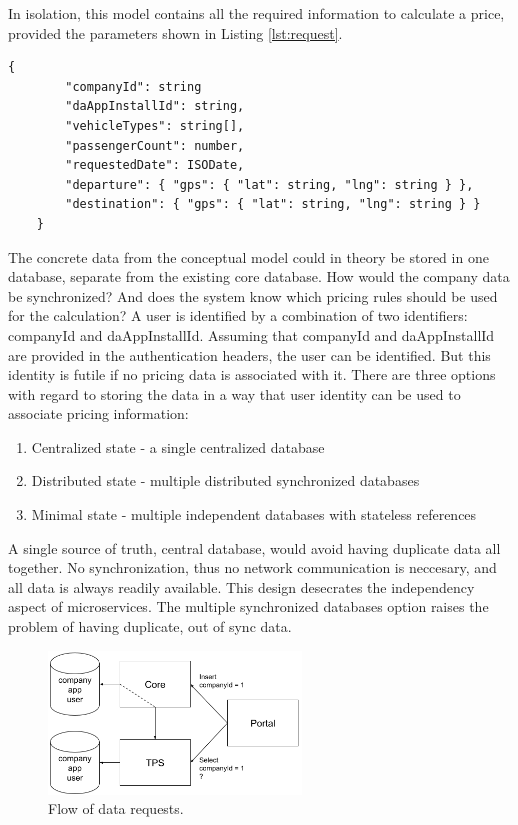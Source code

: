 In isolation, this model contains all the required information to calculate a price, provided the parameters shown in Listing \ref{lst:request}.

\begin{lstlisting}[caption={Minimal external information required for a trip price calculation.}, label={lst:request}]
	{
		"companyId": string
		"daAppInstallId": string,
		"vehicleTypes": string[],
		"passengerCount": number,
		"requestedDate": ISODate,
		"departure": { "gps": { "lat": string, "lng": string } },
		"destination": { "gps": { "lat": string, "lng": string } }
	}
\end{lstlisting}

The concrete data from the conceptual model could in theory be stored in one database, separate from the existing core database. How would the company data be synchronized? And does the system know which pricing rules should be used for the calculation? A user is identified by a combination of two identifiers: companyId and daAppInstallId. Assuming that companyId and daAppInstallId are provided in the authentication headers, the user can be identified. But this identity is futile if no pricing data is associated with it. There are three options with regard to storing the data in a way that user identity can be used to associate pricing information:

\begin{enumerate}
	\item Centralized state - a single centralized database
	\item Distributed state - multiple distributed synchronized databases
	\item Minimal state - multiple independent databases with stateless references
\end{enumerate}

A single source of truth, central database, would avoid having duplicate data all together. No synchronization, thus no network communication is neccesary, and all data is always readily available. This design desecrates the independency aspect of microservices. The multiple synchronized databases option raises the problem of having duplicate, out of sync data.

\begin{figure}[H]
	\centering
	\includegraphics[width=0.6\textwidth]{DataSync}
	\caption[DataSync]{Flow of data requests.}
	\label{fig:DataSync}
\end{figure}

